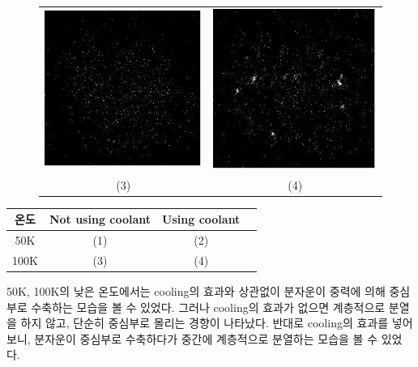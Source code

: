 \documentclass{gshs-hutech}
\begin{document}
\begin{figure}[h]
	\centering
	\begin{tabular}{cc}
		\includegraphics[scale=0.8]{c_3.jpg}&
		\includegraphics[scale=0.8]{c_4.jpg}\\
		(3) & (4)
	\end{tabular}
\end{figure} 

\begin{table}[h]
	\begin{center}
		\begin{tabular}{|c|c|c|c|}
			\hline
			온도&Not using coolant&Using coolant\\
			\hline
			50K&(1)&(2)\\
			\hline
			100K&(3)&(4)\\
			\hline
		\end{tabular}
	\end{center}
\end{table}

50K, 100K의 낮은 온도에서는 cooling의 효과와 상관없이	분자운이 중력에 의해 중심부로 수축하는 모습을 볼 수 있었다. 그러나 cooling의 효과가 없으면 계층적으로 분열을 하지 않고, 단순히 중심부로 몰리는 경향이 나타났다. 반대로 cooling의 효과를 넣어 보니, 분자운이 중심부로 수축하다가 중간에 계층적으로 분열하는 모습을 볼 수 있었다.
\end{document}
